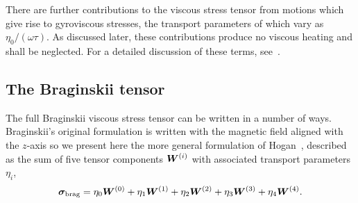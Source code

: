 There are further contributions to the viscous stress tensor from motions which give rise to gyroviscous stresses, the transport parameters of which vary as $\eta_0 / (\omega \tau)$. As discussed later, these contributions produce no viscous heating and shall be neglected. For a detailed discussion of these terms, see~\cite{kaufmanPlasmaViscosityMagnetic1960}.

\subsection{The Braginskii tensor}

The full Braginskii viscous stress tensor can be written in a number of ways. Braginskii's original formulation is written with the magnetic field aligned with the $z$-axis so we present here the more general formulation of Hogan~\cite{hoganCollisionalTransportMomentum1984}, described as the sum of five tensor components ${\bm W}^{(i)}$ with associated transport parameters $\eta_i$,
\begin{equation}
\label{eq:braginskii_tensor}
{\bm \sigma}_{\text{brag}} = \eta_0 {\bm W}^{(0)} + \eta_1 {\bm W}^{(1)} + \eta_2 {\bm W}^{(2)} + \eta_3 {\bm W}^{(3)} + \eta_4 {\bm W}^{(4)}.
\end{equation}

